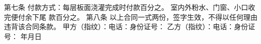 \documentclass[12pt,a4paper]{article}
\begin{document}
第七条
\newline{}
付款方式：每层板面浇灌完成时付款百分之\textunderscore\textunderscore\textunderscore。 室内外粉水、门窗、小口收完便付余下尾
款百分之\textunderscore\textunderscore\textunderscore。
\newline{}
\newline{}
第八条
\newline{}
以上合同一式两份，签字生效，不得以任何理由违背该合同条款。
\newline{}
\newline{}
甲方（指纹）：\hspace*{2cm}电话：\hspace*{3cm}身份证号：
\newline{}
\newline{}
\newline{}
乙方（指纹）：\hspace*{2cm}电话：\hspace*{3cm}身份证号：
\newline{}
\hspace*{8cm}年\hspace*{1cm}月\hspace*{1cm}日






\clearpage
\end{document}
